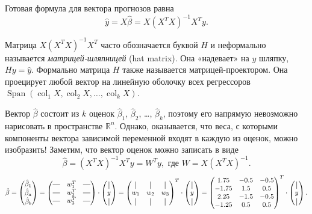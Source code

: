 \documentclass[12pt]{article}
\DeclareMathOperator{\col}{col}
\DeclareMathOperator{\Span}{Span}
\newcommand*{\horzbar}{\rule[.5ex]{2.5ex}{0.5pt}}
\newcommand*{\vertbar}{\rule[-1ex]{0.5pt}{2.5ex}}
\newcommand{\RR}{\mathbb{R}}
\newcommand{\hb}{\hat{\beta}}
\newcommand{\hy}{\hat{y}}
\begin{document}
Готовая формула для вектора прогнозов равна 
\[
\hy = X\hb = X(X^TX)^{-1} X^Ty.
\]


\begin{definition}
Матрица $X(X^TX)^{-1} X^T$ часто обозначается буквой $H$ и неформально называется \emph{матрицей-шляпницей} (hat matrix).
Она «надевает» на $y$ шляпку, $Hy = \hat y$.
Формально матрица $H$ также называется матрицей-проектором. 
Она проецирует любой вектор на линейную оболочку всех регрессоров $\Span(\col_1 X, \col_2 X, \dots, \col_k X)$.
\end{definition}






Вектор $\hb$ состоит из $k$ оценок $\hb_1$, $\hb_2$, \dots, $\hb_k$, поэтому его напрямую невозможно нарисовать в пространстве $\RR^n$.
Однако, оказывается, что веса, с которыми компоненты вектора зависимой переменной входят в каждую из оценок, можно изобразить!
Заметим, что вектор оценок можно записать в виде
\[
\hb = (X^TX)^{-1} X^Ty = W^T y, \text{ где } W= X(X^TX)^{-1}.
\]
\[
\hb = \begin{pmatrix}
    \hb_1 \\
    \hb_a \\
    \hb_b \\
\end{pmatrix}= \begin{pmatrix}
    \horzbar & w_1^T & \horzbar \\
    \horzbar & w_2^T & \horzbar \\
    \horzbar & w_3^T & \horzbar \\    
\end{pmatrix} \cdot \begin{pmatrix}
    \vertbar \\
    y \\
    \vertbar
\end{pmatrix} = 
\begin{pmatrix}
    \vertbar & \vertbar & \vertbar \\
    w_1 & w_2 & w_3 \\
    \vertbar & \vertbar & \vertbar \\    
\end{pmatrix}^T\cdot \begin{pmatrix}
    \vertbar \\
    y \\
    \vertbar
\end{pmatrix} = \begin{pmatrix}
1.75 & -0.5 & -0.5 \\ 
-1.75 & 1.5 & 0.5 \\
2.25 & -1.5 & -0.5 \\
-1.25 & 0.5 & 0.5 \\
\end{pmatrix}^T\cdot \begin{pmatrix}
    \vertbar \\
    y \\
    \vertbar
\end{pmatrix}.
\]
\end{document}
